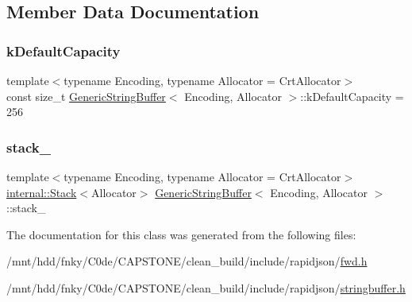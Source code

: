 \subsection{Member Data Documentation}
\mbox{\label{classGenericStringBuffer_ae74f9df854dd5a7db4315ef44b016d22}} 
\subsubsection{\texorpdfstring{k\+Default\+Capacity}{kDefaultCapacity}}
{\footnotesize\ttfamily template$<$typename Encoding, typename Allocator = Crt\+Allocator$>$ \\
const size\+\_\+t \hyperlink{classGenericStringBuffer}{Generic\+String\+Buffer}$<$ Encoding, Allocator $>$\+::k\+Default\+Capacity = 256\hspace{0.3cm}{\ttfamily [static]}}

\mbox{\label{classGenericStringBuffer_aaef716643febb9de5957dbf8ff904409}} 
\subsubsection{\texorpdfstring{stack\+\_\+}{stack\_}}
{\footnotesize\ttfamily template$<$typename Encoding, typename Allocator = Crt\+Allocator$>$ \\
\hyperlink{classinternal_1_1Stack}{internal\+::\+Stack}$<$Allocator$>$ \hyperlink{classGenericStringBuffer}{Generic\+String\+Buffer}$<$ Encoding, Allocator $>$\+::stack\+\_\+\hspace{0.3cm}{\ttfamily [mutable]}}



The documentation for this class was generated from the following files\+:\begin{DoxyCompactItemize}
\item 
/mnt/hdd/fnky/\+C0de/\+C\+A\+P\+S\+T\+O\+N\+E/clean\+\_\+build/include/rapidjson/\hyperlink{fwd_8h}{fwd.\+h}\item 
/mnt/hdd/fnky/\+C0de/\+C\+A\+P\+S\+T\+O\+N\+E/clean\+\_\+build/include/rapidjson/\hyperlink{stringbuffer_8h}{stringbuffer.\+h}\end{DoxyCompactItemize}
